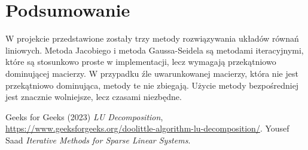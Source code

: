 \documentclass[a4paper,12pt]{article}  %
\begin{document}
\pagebreak

\section{Podsumowanie}
W projekcie przedstawione zostały trzy metody rozwiązywania układów równań
liniowych. Metoda Jacobiego i metoda Gaussa-Seidela są metodami
iteracyjnymi, które są stosunkowo proste w implementacji, lecz wymagają
przekątniowo dominującej macierzy. W przypadku źle uwarunkowanej
macierzy, która nie jest przekątniowo dominująca, metody te nie 
zbiegają. Użycie metody bezpośredniej jest znacznie wolniejsze, lecz
czasami niezbędne. 

\begin{thebibliography}{9}
Geeks for Geeks (2023) \emph{LU Decomposition}, \url{https://www.geeksforgeeks.org/doolittle-algorithm-lu-decomposition/}.
Yousef Saad \emph{Iterative Methods for Sparse Linear Systems}.
\end{thebibliography}

\printbibliography
\end{document}
